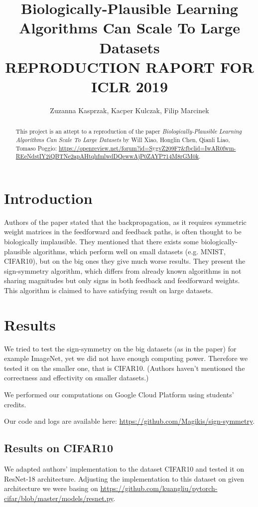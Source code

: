 \documentclass{article} %
\title{Biologically-Plausible Learning\\ Algorithms Can Scale To Large Datasets \\
\small{REPRODUCTION RAPORT FOR ICLR 2019}}
\author{Zuzanna Kasprzak, Kacper Kulczak, Filip Marcinek}
\begin{document}
\maketitle

\begin{abstract}
This project is an attept to a reproduction of the paper \textit{Biologically-Plausible Learning Algorithms Can Scale To Large Datasets} by Will Xiao, Honglin Chen, Qianli Liao, Tomaso Poggio: \url{https://openreview.net/forum?id=SygvZ209F7&fbclid=IwAR0fwm-REeNdstIY2iQBTNe2apAHtqhfmlwdDQewwAjP0ZAYP714M8rGM0k}.
\end{abstract}

\section{Introduction}

Authors of the paper stated that the backpropagation, as it requires symmetric weight matrices in the feedforward and feedback paths, is often thought to be biologically implausible. They mentioned that there exists some biologically-plausible algorithms, which perform well on small datasets (e.g. MNIST, CIFAR10), but on the big ones they give much worse results. They present the sign-symmetry algorithm, which differs from already known algorithms in not sharing magnitudes but only signs in both feedback and feedforward weights. This algorithm is claimed to have satisfying result on large datasets.


\section{Results}
We tried to test the sign-symmetry on the big datasets (as in the paper) for example ImageNet, yet we did not have enough computing power. Therefore we tested it on the smaller one, that is CIFAR10.
(Authors haven't mentioned the correctness and effectivity on smaller datasets.)

We performed our computations on Google Cloud Platform using students' credits.

Our code and logs are available here: \url{https://github.com/Magikis/sign-symmetry}.


\subsection{Results on CIFAR10}
We adapted authors' implementation to the dataset CIFAR10 and tested it on ResNet-18 architecture.
Adjusting the implementation to this dataset on given architecture we were basing on \url{https://github.com/kuangliu/pytorch-cifar/blob/master/models/resnet.py}.
\end{document}
